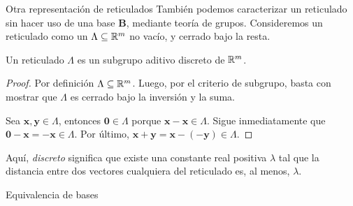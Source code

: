 \begin{frame}{Otra representación de reticulados}
También podemos caracterizar un reticulado sin hacer uso de una base $\mathbf B$, mediante teoría de grupos. Consideremos un reticulado como un $\Lambda \subseteq \mathbb{R}^m$ no vacío, y cerrado bajo la resta.

\begin{proposition}
    Un reticulado $\Lambda$ es un subgrupo aditivo discreto de $\mathbb{R}^m$.
\end{proposition}
\begin{proof}
    Por definición $\Lambda \subseteq \mathbb{R}^m$. Luego, por el criterio de subgrupo, basta con mostrar que $\Lambda$ es cerrado bajo la inversión y la suma.

    Sea $\mathbf x, \mathbf y \in \Lambda$, entonces $\mathbf 0 \in \Lambda$ porque $\mathbf x - \mathbf x \in \Lambda$. Sigue inmediatamente que $\mathbf{0 - x} = \mathbf {-x} \in \Lambda$. Por último, $\mathbf{x+y} = \mathbf x - (-\mathbf y) \in \Lambda$.
\end{proof}

Aquí, {\it discreto} significa que existe una constante real positiva $\lambda$ tal que la distancia entre dos vectores cualquiera del reticulado es, al menos, $\lambda$.
\end{frame}

\begin{frame}{Equivalencia de bases}
\end{frame}


